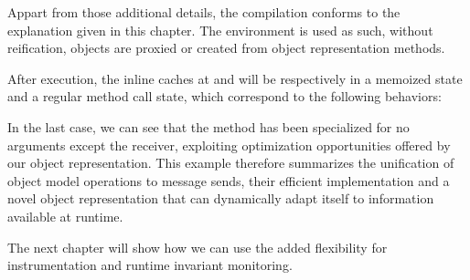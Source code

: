 Appart from those additional details, the compilation conforms to the
explanation given in this chapter. The environment is used as such, without
reification, objects are proxied or created from object representation methods.

After execution, the inline caches at  and  will
be respectively in a memoized state and a regular method call state, which
correspond to the following behaviors: 


In the last case, we can see that the  method has been specialized for
no arguments except the receiver, exploiting optimization opportunities offered
by our object representation. This example therefore summarizes the unification
of object model operations to message sends, their efficient implementation and
a novel object representation that can dynamically adapt itself to information
available at runtime.

The next chapter will show how we can use the added flexibility for
instrumentation and runtime invariant monitoring.


